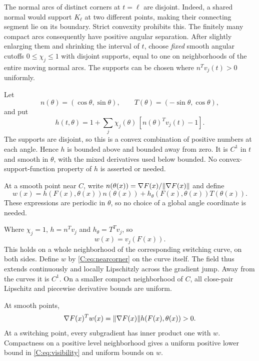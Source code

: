 The normal arcs of distinct corners at $t=\ell$ are disjoint. Indeed, a shared normal would support $K_\ell$ at two different points, making their connecting segment lie on its boundary. Strict convexity prohibits this. The finitely many compact arcs consequently have positive angular separation. After slightly enlarging them and shrinking the interval of $t$, choose \emph{fixed} smooth angular cutoffs $0\le\chi_j\le1$ with disjoint supports, equal to one on neighborhoods of the entire moving normal arcs. The supports can be chosen where $n^Tv_j(t)>0$ uniformly.

Let
\[
 n(\theta)=(\cos\theta,\sin\theta),\qquad
 T(\theta)=(-\sin\theta,\cos\theta),
\]
and put
\begin{equation}\label{C:eq:h}
 h(t,\theta)=1+\sum_j\chi_j(\theta)\,[n(\theta)^Tv_j(t)-1].
\end{equation}
The supports are disjoint, so this is a convex combination of positive numbers at each angle. Hence $h$ is bounded above and bounded away from zero. It is $C^1$ in $t$ and smooth in $\theta$, with the mixed derivatives used below bounded. No convex-support-function property of $h$ is asserted or needed.

At a smooth point near $C$, write $n(\theta(x))=\nabla F(x)/\lVert \nabla F(x)\rVert$ and define
\begin{equation}\label{C:eq:w}
 w(x)=h(F(x),\theta(x))n(\theta(x))
       +h_\theta(F(x),\theta(x))T(\theta(x)).
\end{equation}
These expressions are periodic in $\theta$, so no choice of a global angle coordinate is needed.

Where $\chi_j=1$, $h=n^Tv_j$ and $h_\theta=T^Tv_j$, so
\begin{equation}\label{C:eq:nearcorner}
 w(x)=v_j(F(x)).
\end{equation}
This holds on a whole neighborhood of the corresponding switching curve, on both sides. Define $w$ by \eqref{C:eq:nearcorner} on the curve itself. The field thus extends continuously and locally Lipschitzly across the gradient jump. Away from the curves it is $C^1$. On a smaller compact neighborhood of $C$, all close-pair Lipschitz and piecewise derivative bounds are uniform.

At smooth points,
\begin{equation}\label{C:eq:visibility}
 \nabla F(x)^Tw(x)=\lVert \nabla F(x)\rVert h(F(x),\theta(x))>0.
\end{equation}
At a switching point, every subgradient has inner product one with $w$. Compactness on a positive level neighborhood gives a uniform positive lower bound in \eqref{C:eq:visibility} and uniform bounds on $w$.

